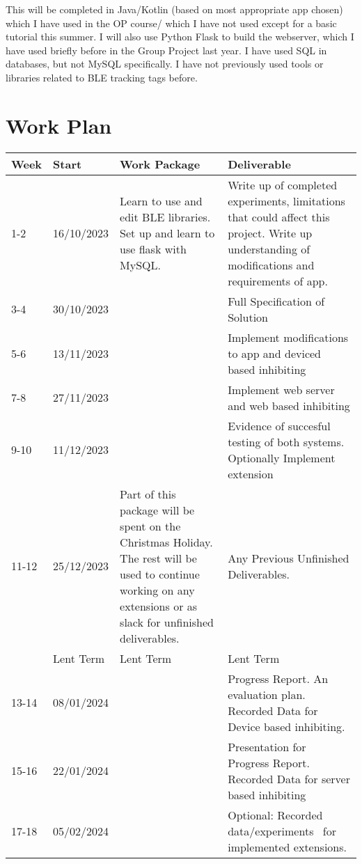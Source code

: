 \documentclass[12pt]{article}
\begin{document}
This will be completed in  Java/Kotlin (based on most appropriate app chosen) which I have used in the OP course/  which I have not used except for a basic tutorial this summer.
 I will also use Python Flask to build the webserver, which I have used briefly before in the Group Project last year. I have used SQL in databases, but not MySQL specifically.  I have not previously used tools or libraries related to BLE tracking tags before.

\section{Work Plan}
\begin{table}[!ht]
    \begin{tabular}{|p{1cm}|p{2cm}|p{6cm}|p{6cm}|}
    \hline
        Week & Start & Work Package & Deliverable \\ \hline
        1-2 & 16/10/2023 & Learn to use and edit BLE libraries. Set up and learn to use flask with MySQL. & Write up of completed experiments, limitations that could affect this project. Write up understanding of modifications and requirements of app. \\ \hline
        3-4 & 30/10/2023 & ~ & Full Specification of Solution \\ \hline
        5-6 & 13/11/2023 & ~ & Implement modifications to app and deviced based inhibiting \\ \hline
        7-8 & 27/11/2023 & ~ & Implement web server and web based inhibiting \\ \hline
        9-10 & 11/12/2023 & ~ & Evidence of succesful testing of both systems. Optionally Implement extension \\ \hline
        11-12 & 25/12/2023 & Part of this package will be spent on the Christmas Holiday. The rest will be used to continue working on any extensions or as slack for unfinished deliverables. & Any Previous Unfinished Deliverables. \\ \hline
        & Lent Term & Lent Term & Lent Term \\ \hline
        13-14 & 08/01/2024 & ~ & Progress Report. An evaluation plan. Recorded Data for Device based inhibiting. \\ \hline
        15-16 & 22/01/2024 & ~ & Presentation for Progress Report.   Recorded Data for server based inhibiting \\ \hline
        17-18 & 05/02/2024 & ~ & Optional: Recorded data/experiments  for implemented extensions. \\ \hline

\end{tabular}
\end{table}
\end{document}
